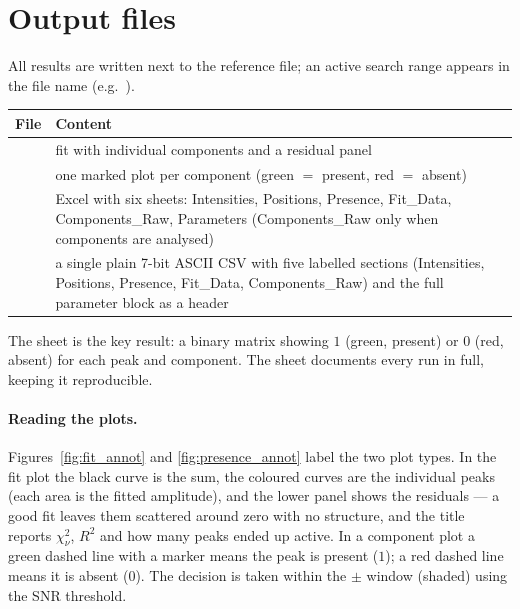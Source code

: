 \documentclass[11pt,a4paper]{article}
\begin{document}
\section{Output files}
All results are written next to the reference file; an active search range appears
in the file name (e.g.\ ).

\begin{table}[h]\small\centering
\begin{tabularx}{\linewidth}{@{}l L@{}}
\toprule
\textbf{File} & \textbf{Content}\\
\midrule
{} & fit with individual components and a residual panel\\
 & one marked plot per component (green $=$ present, red $=$ absent)\\
 & Excel with six sheets: Intensities, Positions, Presence, Fit\_Data, Components\_Raw, Parameters (Components\_Raw only when components are analysed)\\
 & a single plain 7-bit ASCII CSV with five labelled sections (Intensities, Positions, Presence, Fit\_Data, Components\_Raw) and the full parameter block as a header\\
\bottomrule
\end{tabularx}
\end{table}

The  sheet is the key result: a binary matrix showing $1$ (green,
present) or $0$ (red, absent) for each peak and component. The 
sheet documents every run in full, keeping it reproducible.

\paragraph{Reading the plots.} Figures~\ref{fig:fit_annot} and
\ref{fig:presence_annot} label the two plot types. In the fit plot the black curve
is the sum, the coloured curves are the individual peaks (each area is the fitted
amplitude), and the lower panel shows the residuals --- a good fit leaves them
scattered around zero with no structure, and the title reports
$\chi^2_\nu$, $R^2$ and how many peaks ended up active. In a component plot a green
dashed line with a marker means the peak is present ($1$); a red dashed line means
it is absent ($0$). The decision is taken within the $\pm$ window
(shaded) using the SNR threshold.
\end{document}
